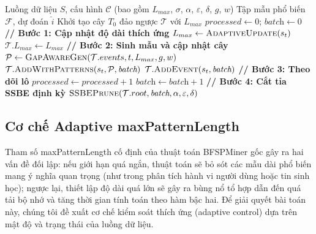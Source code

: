 \documentclass{article}
\begin{document}
\begin{algorithm}[!ht]
\caption{BFSPMiner-Improved -- Vòng lặp xử lý chính}
\label{alg:main}
\small
\begin{algorithmic}[1]
\REQUIRE Luồng dữ liệu $S$, cấu hình $\mathcal{C}$ (bao gồm $L_{max}$, $\sigma$, $\alpha$, $\varepsilon$, $\delta$, $g$, $w$)
\ENSURE Tập mẫu phổ biến $\mathcal{F}$, dự đoán $\hat{i}$
\STATE Khởi tạo cây $T_0$ đảo ngược $\mathcal{T}$ với $L_{max}$
\STATE $\textit{processed} \leftarrow 0$; $\textit{batch} \leftarrow 0$
    \STATE \textbf{// Bước 1: Cập nhật độ dài thích ứng}
        \STATE $L_{max} \leftarrow \textsc{AdaptiveUpdate}(s_t)$ 
        \STATE $\mathcal{T}.L_{max} \leftarrow L_{max}$
    \ENDIF
    \STATE \textbf{// Bước 2: Sinh mẫu và cập nhật cây}
        \STATE $\mathcal{P} \leftarrow \textsc{GapAwareGen}(\mathcal{T}.events, t, L_{max}, g, w)$ 
        \STATE $\mathcal{T}.\textsc{AddWithPatterns}(s_t, \mathcal{P}, \textit{batch})$
    \ELSE
        \STATE $\mathcal{T}.\textsc{AddEvent}(s_t, \textit{batch})$
    \ENDIF
    \STATE \textbf{// Bước 3: Theo dõi lô}
    \STATE $\textit{processed} \leftarrow \textit{processed} + 1$
        \STATE $\textit{batch} \leftarrow \textit{batch} + 1$
    \ENDIF
    \STATE \textbf{// Bước 4: Cắt tỉa SSBE định kỳ}
        \STATE $\textsc{SSBEPrune}(\mathcal{T}.root, \textit{batch}, \alpha, \varepsilon, \delta)$ 
    \ENDIF
\ENDFOR
\end{algorithmic}
\end{algorithm}

\vspace{-0.5em}
\subsection{Cơ chế Adaptive maxPatternLength}
Tham số maxPatternLength cố định của thuật toán BFSPMiner gốc gây ra hai vấn đề đối lập: nếu giới hạn quá ngắn, thuật toán sẽ bỏ sót các mẫu dài phổ biến mang ý nghĩa quan trọng (như trong phân tích hành vi người dùng hoặc tin sinh học); ngược lại, thiết lập độ dài quá lớn sẽ gây ra bùng nổ tổ hợp dẫn đến quá tải bộ nhớ và tăng thời gian tính toán theo hàm bậc hai. Để giải quyết bài toán này, chúng tôi đề xuất cơ chế kiểm soát thích ứng (adaptive control) dựa trên mật độ và trạng thái của luồng dữ liệu.
\end{document}
